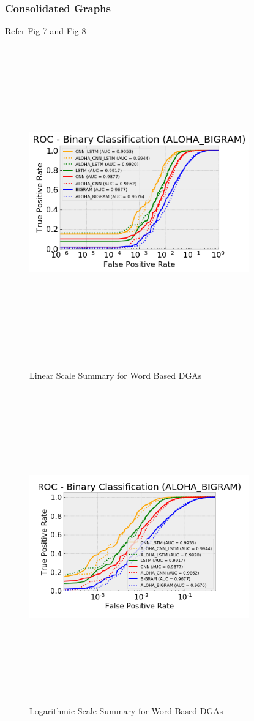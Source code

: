 \documentclass[conference]{IEEEtran}
\begin{document}
\subsubsection{Consolidated Graphs}
Refer Fig 7 and Fig 8\\
\begin{figure}[!h]
\centerline{\includegraphics[width=9.5cm,height=13.5cm,keepaspectratio]{linear_scale_word_dga.png}}
\caption{Linear Scale Summary for Word Based DGAs }
\label{fig}
\centerline{\includegraphics[width=9.5cm,height=13.5cm,keepaspectratio]{logscale_word_dga.png}}
\caption{Logarithmic Scale Summary for Word Based DGAs }
\label{fig}
\end{figure}
\end{document}
